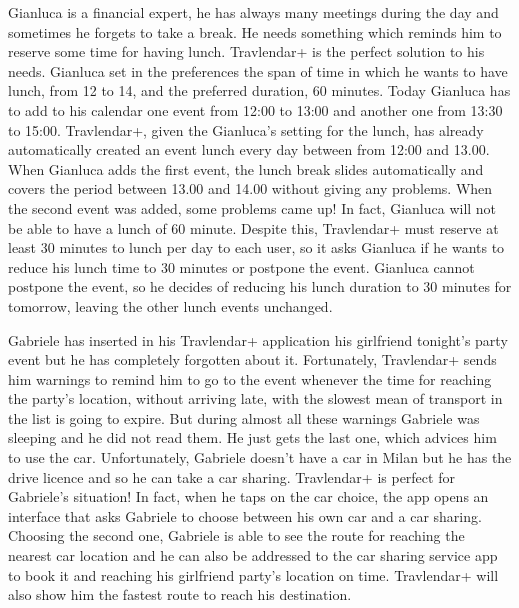 Gianluca is a financial expert, he has always many meetings during the day and sometimes he forgets to take a break. He needs something which reminds him to reserve some time for having lunch. Travlendar+ is the perfect solution to his needs. Gianluca set in the preferences the span of time in which he wants to have lunch, from 12 to 14, and the preferred duration, 60 minutes. 
Today Gianluca has to add to his calendar one event from 12:00 to 13:00 and another one from 13:30 to 15:00. Travlendar+, given the Gianluca’s setting for the lunch, has already automatically created an event lunch every day between from 12:00 and 13.00. When Gianluca adds the first event, the lunch break slides automatically and covers the period between 13.00 and 14.00 without giving any problems. When the second event was added, some problems came up! In fact, Gianluca will not be able to have a lunch of 60 minute. Despite this, Travlendar+ must reserve at least 30 minutes to lunch per day to each user, so it asks Gianluca if he wants to reduce his lunch time to 30 minutes or postpone the event. Gianluca cannot postpone the event, so he decides of reducing his lunch duration to 30 minutes for tomorrow, leaving the other lunch events unchanged.

Gabriele has inserted in his Travlendar+ application his girlfriend tonight’s party event but he has completely forgotten about it. Fortunately, Travlendar+ sends him warnings to remind him to go to the event whenever the time for reaching the party’s location, without arriving late, with the slowest mean of transport in the list is going to expire. But during almost all these warnings Gabriele was sleeping and he did not read them. He just gets the last one, which advices him to use the car. Unfortunately, Gabriele doesn’t have a car in Milan but he has the drive licence and so he can take a car sharing. Travlendar+ is perfect for Gabriele’s situation! In fact, when he taps on the car choice, the app opens an interface that asks Gabriele to choose between his own car and a car sharing. Choosing the second one, Gabriele is able to see the route for reaching the nearest car location and he can also be addressed to the car sharing service app to book it and reaching his girlfriend party’s location on time. Travlendar+ will also show him the fastest route to reach his destination.